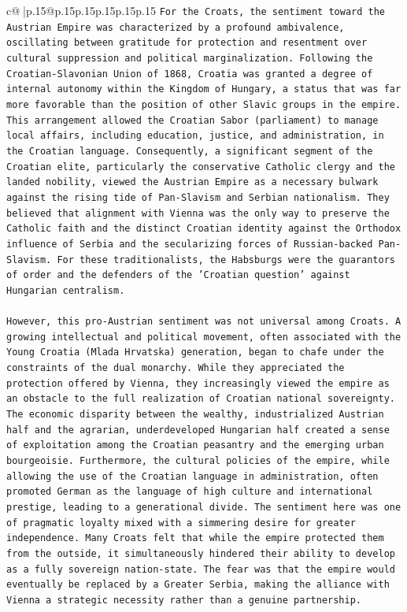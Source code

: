 \documentclass{article}
\begin{document}
{\begin{supertabular}{c@{$\;$}|p{.15\linewidth}@{}p{.15\linewidth}p{.15\linewidth}p{.15\linewidth}p{.15\linewidth}p{.15\linewidth}}
{{{\texttt{For the Croats, the sentiment toward the Austrian Empire was characterized by a profound ambivalence, oscillating between gratitude for protection and resentment over cultural suppression and political marginalization. Following the Croatian{-}Slavonian Union of 1868, Croatia was granted a degree of internal autonomy within the Kingdom of Hungary, a status that was far more favorable than the position of other Slavic groups in the empire. This arrangement allowed the Croatian Sabor (parliament) to manage local affairs, including education, justice, and administration, in the Croatian language. Consequently, a significant segment of the Croatian elite, particularly the conservative Catholic clergy and the landed nobility, viewed the Austrian Empire as a necessary bulwark against the rising tide of Pan{-}Slavism and Serbian nationalism. They believed that alignment with Vienna was the only way to preserve the Catholic faith and the distinct Croatian identity against the Orthodox influence of Serbia and the secularizing forces of Russian{-}backed Pan{-}Slavism. For these traditionalists, the Habsburgs were the guarantors of order and the defenders of the 'Croatian question' against Hungarian centralism.} \\
\\ 
\texttt{However, this pro{-}Austrian sentiment was not universal among Croats. A growing intellectual and political movement, often associated with the Young Croatia (Mlada Hrvatska) generation, began to chafe under the constraints of the dual monarchy. While they appreciated the protection offered by Vienna, they increasingly viewed the empire as an obstacle to the full realization of Croatian national sovereignty. The economic disparity between the wealthy, industrialized Austrian half and the agrarian, underdeveloped Hungarian half created a sense of exploitation among the Croatian peasantry and the emerging urban bourgeoisie. Furthermore, the cultural policies of the empire, while allowing the use of the Croatian language in administration, often promoted German as the language of high culture and international prestige, leading to a generational divide. The sentiment here was one of pragmatic loyalty mixed with a simmering desire for greater independence. Many Croats felt that while the empire protected them from the outside, it simultaneously hindered their ability to develop as a fully sovereign nation{-}state. The fear was that the empire would eventually be replaced by a Greater Serbia, making the alliance with Vienna a strategic necessity rather than a genuine partnership.} \\
}}}
\end{supertabular}}
\end{document}
